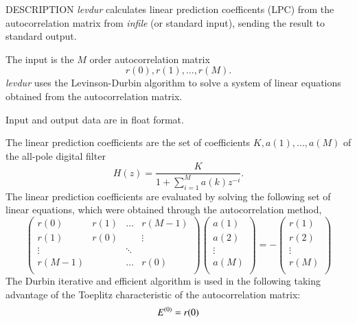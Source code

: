 \begin{qsection}{DESCRIPTION}
{\em levdur} calculates linear prediction coefficents (LPC) 
from the autocorrelation matrix from {\em infile} (or standard input), 
sending the result to standard output.

The input is the $M$ order autocorrelation matrix
\begin{displaymath}
  r(0),r(1),\dots,r(M).
\end{displaymath}
{\em levdur} uses the Levinson-Durbin algorithm 
to solve a system of linear equations
obtained from the autocorrelation matrix.

Input and output data are in float format.
\par
The linear prediction coefficients are the set of coefficients
$K, a(1), \dots, a(M)$ of the all-pole digital filter
\begin{displaymath}
H(z) = \frac{K}{\displaystyle{1+\sum_{i=1}^{M}a(k)z^{-i}}}.
\end{displaymath}
The linear prediction coefficients are evaluated by solving
the following set of linear equations, which were obtained
through the autocorrelation method,
\begin{displaymath}
\begin{pmatrix}
        r(0) & r(1) & \dots & r(M-1) \\
        r(1) & r(0) &        & \vdots \\
        \vdots &    & \ddots &         \\
        r(M-1) &    & \dots & r(0)   \\
\end{pmatrix}
\begin{pmatrix}
	a(1) \\
	a(2) \\
	\vdots \\
	a(M) \\
\end{pmatrix}
= - 
\begin{pmatrix}
	r(1) \\
	r(2) \\
	\vdots \\
	r(M) \\
\end{pmatrix}
\end{displaymath}
The Durbin iterative and efficient algorithm is used
in the following taking advantage of the Toeplitz characteristic
of the autocorrelation matrix:
\begin{align}
E^{(0)}    &= r(0) \notag \\

\end{align}
\end{qsection}
